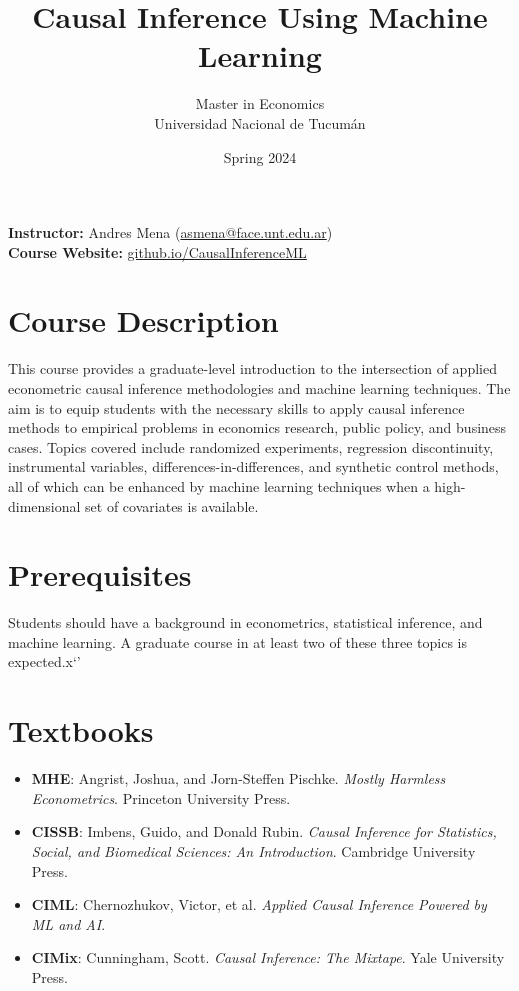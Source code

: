 \documentclass[12pt]{article}
\title{Causal Inference Using Machine Learning}
\author{\large Master in Economics \\ Universidad Nacional de Tucumán}
\date{\large Spring 2024}
\begin{document}
\maketitle

\noindent
\textbf{Instructor:} Andres Mena (\href{mailto:asmena@face.unt.edu.ar}{asmena@face.unt.edu.ar}) \\[0.5em]
\textbf{Course Website:} \small \href{http://www.github.io/CausalInferenceML}{\textcolor{myblue}{github.io/CausalInferenceML}}
\section*{Course Description}

This course provides a graduate-level introduction to the intersection of applied econometric causal inference methodologies and machine learning techniques. The aim is to equip students with the necessary skills to apply causal inference methods to empirical problems in economics research, public policy, and business cases. Topics covered include randomized experiments, regression discontinuity, instrumental variables, differences-in-differences, and synthetic control methods, all of which can be enhanced by machine learning techniques when a high-dimensional set of covariates is available.

\section*{Prerequisites}
Students should have a background in econometrics, statistical inference, and machine learning. A graduate course in at least two of these three topics is expected.x`'

\section*{Textbooks}
\begin{itemize}
    \item \textbf{MHE}: Angrist, Joshua, and Jorn-Steffen Pischke. \textit{Mostly Harmless Econometrics}. Princeton University Press.
    \item \textbf{CISSB}: Imbens, Guido, and Donald Rubin. \textit{Causal Inference for Statistics, Social, and Biomedical Sciences: An Introduction}. Cambridge University Press.
    \item \textbf{CIML}: Chernozhukov, Victor, et al. \textit{Applied Causal Inference Powered by ML and AI}.
    \item \textbf{CIMix}: Cunningham, Scott. \textit{Causal Inference: The Mixtape}. Yale University Press.
\end{itemize}
\end{document}
